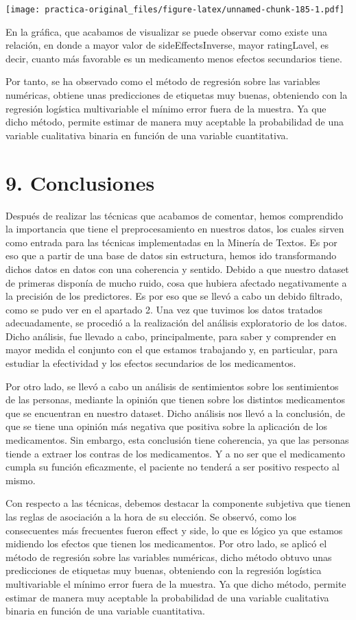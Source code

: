\documentclass[spanish,]{article}
\begin{document}
\texttt{[image: practica-original\_files/figure-latex/unnamed-chunk-185-1.pdf]}

En la gráfica, que acabamos de visualizar se puede observar como existe
una relación, en donde a mayor valor de sideEffectsInverse, mayor
ratingLavel, es decir, cuanto más favorable es un medicamento menos
efectos secundarios tiene.

Por tanto, se ha observado como el método de regresión sobre las
variables numéricas, obtiene unas predicciones de etiquetas muy buenas,
obteniendo con la regresión logística multivariable el mínimo error
fuera de la muestra. Ya que dicho método, permite estimar de manera muy
aceptable la probabilidad de una variable cualitativa binaria en función
de una variable cuantitativa.

\newpage

\section{9. Conclusiones}\label{conclusiones}

Después de realizar las técnicas que acabamos de comentar, hemos
comprendido la importancia que tiene el preprocesamiento en nuestros
datos, los cuales sirven como entrada para las técnicas implementadas en
la Minería de Textos. Es por eso que a partir de una base de datos sin
estructura, hemos ido transformando dichos datos en datos con una
coherencia y sentido. Debido a que nuestro dataset de primeras disponía
de mucho ruido, cosa que hubiera afectado negativamente a la precisión
de los predictores. Es por eso que se llevó a cabo un debido filtrado,
como se pudo ver en el apartado 2. Una vez que tuvimos los datos
tratados adecuadamente, se procedió a la realización del análisis
exploratorio de los datos. Dicho análisis, fue llevado a cabo,
principalmente, para saber y comprender en mayor medida el conjunto con
el que estamos trabajando y, en particular, para estudiar la efectividad
y los efectos secundarios de los medicamentos.

Por otro lado, se llevó a cabo un análisis de sentimientos sobre los
sentimientos de las personas, mediante la opinión que tienen sobre los
distintos medicamentos que se encuentran en nuestro dataset. Dicho
análisis nos llevó a la conclusión, de que se tiene una opinión más
negativa que positiva sobre la aplicación de los medicamentos. Sin
embargo, esta conclusión tiene coherencia, ya que las personas tiende a
extraer los contras de los medicamentos. Y a no ser que el medicamento
cumpla su función eficazmente, el paciente no tenderá a ser positivo
respecto al mismo.

Con respecto a las técnicas, debemos destacar la componente subjetiva
que tienen las reglas de asociación a la hora de su elección. Se
observó, como los consecuentes más frecuentes fueron effect y side, lo
que es lógico ya que estamos midiendo los efectos que tienen los
medicamentos. Por otro lado, se aplicó el método de regresión sobre las
variables numéricas, dicho método obtuvo unas predicciones de etiquetas
muy buenas, obteniendo con la regresión logística multivariable el
mínimo error fuera de la muestra. Ya que dicho método, permite estimar
de manera muy aceptable la probabilidad de una variable cualitativa
binaria en función de una variable cuantitativa.
\end{document}
